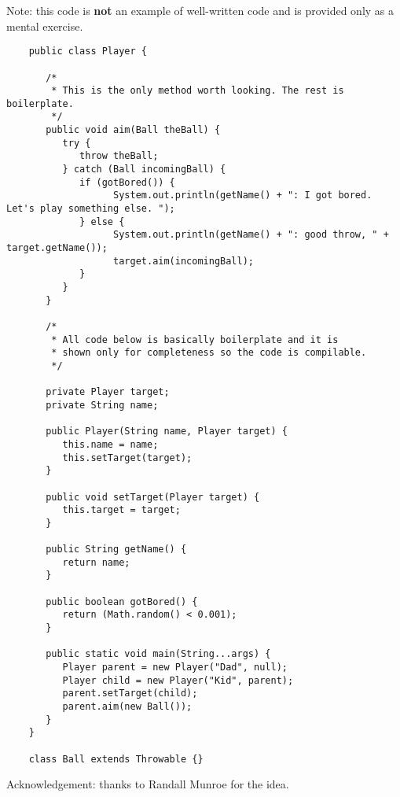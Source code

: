 \documentclass{article}
\begin{document}
Note: this code is \textbf{not} an example of well-written code and is provided
only as a mental exercise. 

\begin{verbatim}
    public class Player {
    
       /*
        * This is the only method worth looking. The rest is boilerplate. 
        */
       public void aim(Ball theBall) {
          try {
             throw theBall;
          } catch (Ball incomingBall) {
             if (gotBored()) {
    	           System.out.println(getName() + ": I got bored. Let's play something else. ");
             } else {
    	           System.out.println(getName() + ": good throw, " + target.getName());
    	           target.aim(incomingBall);
             }
          }
       }

       /*
        * All code below is basically boilerplate and it is
        * shown only for completeness so the code is compilable. 
        */
    
       private Player target;
       private String name;
       
       public Player(String name, Player target) {
          this.name = name;
          this.setTarget(target);
       }
       
       public void setTarget(Player target) {
          this.target = target;
       }
       
       public String getName() {
          return name;
       }
    
       public boolean gotBored() {
          return (Math.random() < 0.001);
       }
       
       public static void main(String...args) {
          Player parent = new Player("Dad", null);
          Player child = new Player("Kid", parent);
          parent.setTarget(child);
          parent.aim(new Ball());
       }
    }
    
    class Ball extends Throwable {}
\end{verbatim}

Acknowledgement: thanks to Randall Munroe for the idea.     
    
\end{document}
